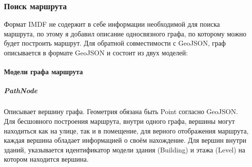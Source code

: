     \subsubsection{Поиск маршрута}
      Формат IMDF не содержит в себе информации необходимой для поиска маршрута, по этому я добавил описание односвязного графа, по которому можно будет построить маршрут. Для обратной совместимости с GeoJSON, граф описывается в формате GeoJSON и состоит из двух моделей:
      \paragraph{Модели графа маршрута}
        \subparagraph{PathNode}
          Описывает вершину графа. Геометрия обязана быть Point согласно GeoJSON. Для бесшовного построения маршрута, внутри одного графа, вершины могут находиться как на улице, так и в помещение, для верного отображения маршрута, каждая вершина обладает информацией о своём нахождение. Для вершин внутри зданий, указывается идентификатор модели здания (Building) и этажа (Level) на котором находится вершина.
